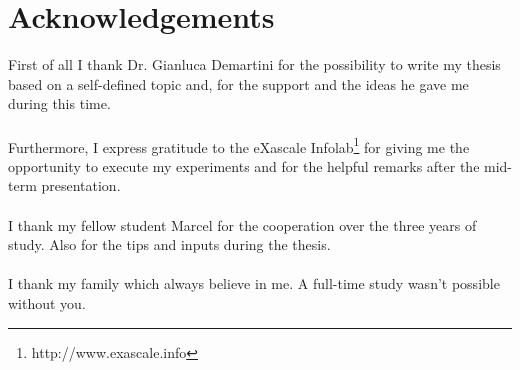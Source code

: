 \chapter*{Acknowledgements}
\thispagestyle{empty}
First of all I thank Dr. Gianluca Demartini for the possibility to write my thesis based on a self-defined topic and, for the support and the ideas he gave me during this time.\\\\
Furthermore, I express gratitude to the eXascale Infolab\footnote{http://www.exascale.info} for giving me the opportunity to execute my experiments and for the helpful remarks after the mid-term presentation.\\\\
I thank my fellow student Marcel for the cooperation over the three years of study. Also for the tips and inputs during the thesis.\\\\
I thank my family which always believe in me. A full-time study wasn't possible without you. 
\clearpage
